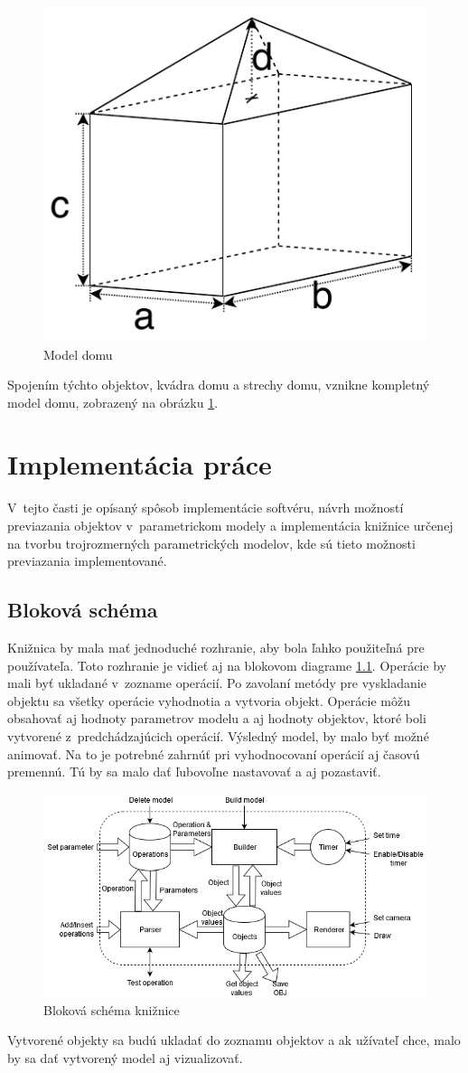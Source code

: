 \begin{figure}[H]
	\centering
	\includegraphics[height=0.3\textwidth]{obrazky-figures/Examples/B4.pdf}
	\caption{Model domu}
	\label{fig:B4}
\end{figure}
Spojením týchto objektov, kvádra domu a strechy domu, vznikne kompletný model domu, zobrazený na obrázku \ref{fig:B4}.


\chapter{Implementácia práce}
V~tejto časti je opísaný spôsob implementácie softvéru, návrh možností previazania objektov v~parametrickom modely a implementácia knižnice určenej na tvorbu trojrozmerných parametrických modelov, kde sú tieto možnosti previazania implementované.  

\section{Bloková schéma}

Knižnica by mala mať jednoduché rozhranie, aby bola ľahko použiteľná pre používateľa. Toto rozhranie je vidieť aj na blokovom diagrame \ref{fig:blockDiagram}. Operácie by mali byť ukladané v~zozname operácií. Po zavolaní metódy pre vyskladanie objektu sa všetky operácie vyhodnotia a vytvoria objekt. Operácie môžu obsahovať aj hodnoty parametrov modelu a aj hodnoty objektov, ktoré boli vytvorené z~predchádzajúcich operácií. Výsledný model, by malo byť možné animovať. Na to je potrebné zahrnúť pri vyhodnocovaní operácií aj časovú premennú. Tú by sa malo dať ľubovoľne nastavovať a aj pozastaviť. 
\begin{figure}[H]
	\centering
	\includegraphics[width=1\textwidth]{obrazky-figures/Diagram.png}
	\caption{Bloková schéma knižnice }
	\label{fig:blockDiagram}
\end{figure}
Vytvorené objekty sa budú ukladať do zoznamu objektov a ak užívateľ chce, malo by sa dať vytvorený model aj vizualizovať. 

